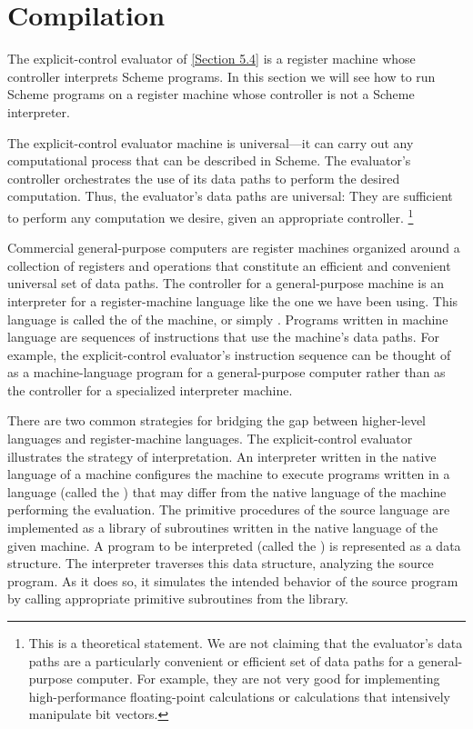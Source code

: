 \section{Compilation}
\label{Section 5.5}

The explicit-control evaluator of \cref{Section 5.4} is a register machine whose controller interprets Scheme programs.
In this section we will see how to run Scheme programs on a register machine whose controller is not a Scheme interpreter.

The explicit-control evaluator machine is universal---it can carry out any computational process that can be described in Scheme.
The evaluator’s controller orchestrates the use of its data paths to perform the desired computation.
Thus, the evaluator’s data paths are universal:
They are sufficient to perform any computation we desire, given an appropriate controller.%
\footnote{%
	This is a theoretical statement.
	We are not claiming that the evaluator’s data paths are a particularly convenient or efficient set of data paths for a general-purpose computer.
	For example, they are not very good for implementing high-performance floating-point calculations or calculations that intensively manipulate bit vectors.
}

Commercial general-purpose computers are register machines organized around a collection of registers and operations that constitute an efficient and convenient universal set of data paths.
The controller for a general-purpose machine is an interpreter for a register-machine language like the one we have been using.
This language is called the  of the machine, or simply .
Programs written in machine language are sequences of instructions that use the machine’s data paths.
For example, the explicit-control evaluator’s instruction sequence can be thought of as a machine-language program for a general-purpose computer rather than as the controller for a specialized interpreter machine.

There are two common strategies for bridging the gap between higher-level languages and register-machine languages.
The explicit-control evaluator illustrates the strategy of interpretation.
An interpreter written in the native language of a machine configures the machine to execute programs written in a language (called the ) that may differ from the native language of the machine performing the evaluation.
The primitive procedures of the source language are implemented as a library of subroutines written in the native language of the given machine.
A program to be interpreted (called the ) is represented as a data structure.
The interpreter traverses this data structure, analyzing the source program.
As it does so, it simulates the intended behavior of the source program by calling appropriate primitive subroutines from the library.


